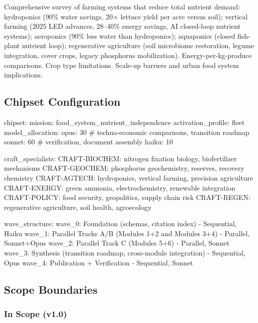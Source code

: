 \documentclass[11pt,letterpaper]{article}
\begin{document}
Comprehensive survey of farming systems that reduce total nutrient demand: hydroponics (90\% water savings, 20$\times$ lettuce yield per acre versus soil); vertical farming (2025 LED advances, 28--40\% energy savings, AI closed-loop nutrient systems); aeroponics (90\% less water than hydroponics); aquaponics (closed fish-plant nutrient loop); regenerative agriculture (soil microbiome restoration, legume integration, cover crops, legacy phosphorus mobilization). Energy-per-kg-produce comparisons. Crop type limitations. Scale-up barriers and urban food system implications.

\subsection{Chipset Configuration}

\begin{asciibox}
chipset:
  mission: food_system_nutrient_independence
  activation_profile: fleet
  model_allocation:
    opus:   30%
                  # techno-economic comparisons, transition roadmap
    sonnet: 60%
                  # verification, document assembly
    haiku:  10%

  craft_specialists:
    CRAFT-BIOCHEM: nitrogen fixation biology, biofertilizer mechanisms
    CRAFT-GEOCHEM: phosphorus geochemistry, reserves, recovery chemistry
    CRAFT-AGTECH:  hydroponics, vertical farming, precision agriculture
    CRAFT-ENERGY:  green ammonia, electrochemistry, renewable integration
    CRAFT-POLICY:  food security, geopolitics, supply chain risk
    CRAFT-REGEN:   regenerative agriculture, soil health, agroecology

  wave_structure:
    wave_0: Foundation (schemas, citation index) - Sequential, Haiku
    wave_1: Parallel Tracks A/B (Modules 1+2 and Modules 3+4) - Parallel, Sonnet+Opus
    wave_2: Parallel Track C (Modules 5+6) - Parallel, Sonnet
    wave_3: Synthesis (transition roadmap, cross-module integration) - Sequential, Opus
    wave_4: Publication + Verification - Sequential, Sonnet
\end{asciibox}

\subsection{Scope Boundaries}

\subsubsection{In Scope (v1.0)}
\end{document}
